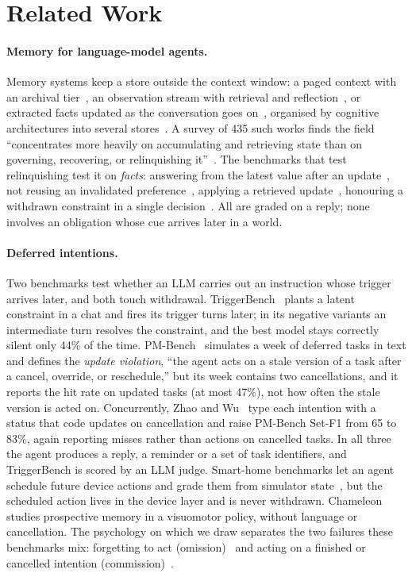 \section{Related Work}
\label{sec:related}

\paragraph{Memory for language-model agents.}
Memory systems keep a store outside the context window: a paged context
with an archival tier~\cite{packer2023memgpt}, an observation stream with
retrieval and reflection~\cite{park2023generative}, or extracted facts
updated as the conversation goes on~\cite{chhikara2025mem0}, organised by
cognitive architectures into several stores~\cite{sumers2024coala}. A
survey of 435 such works finds the field
``concentrates more heavily on accumulating and retrieving state than on
governing, recovering, or relinquishing it''~\cite{ding2026alwayson}. The
benchmarks that test relinquishing test it on \emph{facts}: answering from
the latest value after an update~\cite{wu2025longmemeval,hu2025memoryagentbench},
not reusing an invalidated preference~\cite{uddin2026memora}, applying a
retrieved update~\cite{chao2026stale}, honouring a withdrawn constraint in
a single decision~\cite{nakayashiki2026stale}. All are graded on a reply;
none involves an obligation whose cue arrives later in a world.

\paragraph{Deferred intentions.}
Two benchmarks test whether an LLM carries out an instruction whose trigger
arrives later, and both touch withdrawal. TriggerBench~\cite{zhang2026triggerbench}
plants a latent constraint in a chat and fires its trigger turns later; in
its negative variants an intermediate turn resolves the constraint, and the
best model stays correctly silent only 44\% of the time.
PM-Bench~\cite{liu2026pmbench} simulates a week of deferred tasks in text
and defines the \emph{update violation}, ``the agent acts on a stale version
of a task after a cancel, override, or reschedule,'' but its week contains
two cancellations, and it reports the hit rate on updated tasks (at most
47\%), not how often the stale version is acted on. Concurrently, Zhao and
Wu~\cite{zhao2026pis} type each intention with a status that code updates
on cancellation and raise PM-Bench Set-F1 from 65 to 83\%, again reporting
misses rather than actions on cancelled tasks. In all three the agent produces a
reply, a reminder or a set of task identifiers, and TriggerBench is scored
by an LLM judge. Smart-home benchmarks let an agent schedule future device
actions and grade them from simulator state~\cite{seo2026simuhome}, but the
scheduled action lives in the device layer and is never withdrawn.
Chameleon~\cite{chameleon2026} studies prospective
memory in a visuomotor policy, without language or cancellation. The
psychology on which we draw separates the two failures these benchmarks
mix: forgetting to act (omission)~\cite{einstein1990normal} and acting on a
finished or cancelled intention (commission)~\cite{scullin2012whoops}.

